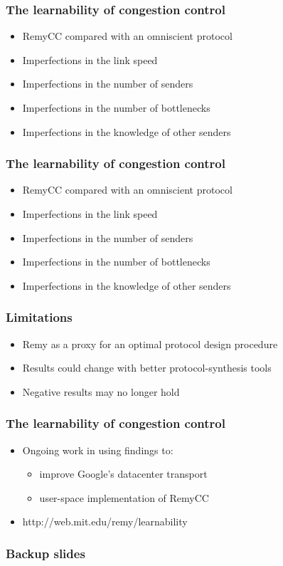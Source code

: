 \documentclass[svgnames]{beamer}
\begin{document}
\begin{Large}


\begin{frame}
\frametitle{The learnability of congestion control}
\begin{itemize}
\item RemyCC compared with an omniscient protocol
\item Imperfections in the link speed
\item Imperfections in the number of senders
\item Imperfections in the number of bottlenecks
\item Imperfections in the knowledge of other senders
\end{itemize}
\end{frame}

 

\begin{frame}
\frametitle{The learnability of congestion control}
\begin{itemize}
\item RemyCC compared with an omniscient protocol
\item Imperfections in the link speed
\item Imperfections in the number of senders
\item Imperfections in the number of bottlenecks
\item Imperfections in the knowledge of other senders
\end{itemize}
\end{frame}



\begin{frame}
\frametitle{Limitations}
\begin{itemize}
\item<2-> Remy as a proxy for an optimal protocol design procedure
\item<3-> Results could change with better protocol-synthesis tools
\item<4-> Negative results may no longer hold
\end{itemize}
\end{frame}

\begin{frame}
\frametitle{The learnability of congestion control}
\noindent
\begin{itemize}
\item<1-> Ongoing work in using findings to:
\begin{itemize}
\item<2-> improve Google's datacenter transport
\item<3-> user-space implementation of RemyCC
\end{itemize}
\item<4-> http://web.mit.edu/remy/learnability
\end{itemize}
\end{frame}

\end{Large}

\begin{frame}
\frametitle{Backup slides}
\end{frame}







\end{document}
